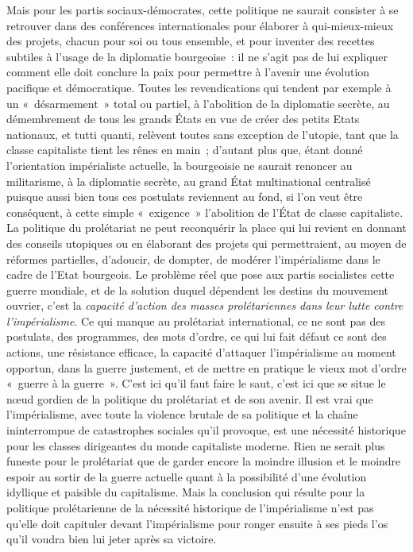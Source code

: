 \documentclass[french,twoside]{book} %
\begin{document}
Mais pour les partis sociaux-démocrates, cette politique ne saurait consister à se retrouver dans des conférences internationales pour élaborer à qui-mieux-mieux des projets, chacun pour soi ou tous ensemble, et pour inventer des recettes subtiles à l’usage de la diplomatie bourgeoise : il ne s’agit pas de lui expliquer comment elle doit conclure la paix pour permettre à l’avenir une évolution pacifique et démocratique. Toutes les revendications qui tendent par exemple à un « désarmement » total ou partiel, à l’abolition de la diplomatie secrète, au démembrement de tous les grands États en vue de créer des petits Etats nationaux, et tutti quanti, relèvent toutes sans exception de l’utopie, tant que la classe capitaliste tient les rênes en main ; d’autant plus que, étant donné l’orientation impérialiste actuelle, la bourgeoisie ne saurait renoncer au militarisme, à la diplomatie secrète, au grand État multinational centralisé puisque aussi bien tous ces postulats reviennent au fond, si l’on veut être conséquent, à cette simple « exigence » l’abolition de l’État de classe capitaliste. La politique du prolétariat ne peut reconquérir la place qui lui revient en donnant des conseils utopiques ou en élaborant des projets qui permettraient, au moyen de réformes partielles, d’adoucir, de dompter, de modérer l’impérialisme dans le cadre de l’Etat bourgeois. Le problème réel que pose aux partis socialistes cette guerre mondiale, et de la solution duquel dépendent les destins du mouvement ouvrier, c’est la \emph{capacité d’action des masses prolétariennes dans leur lutte contre l’impérialisme}. Ce qui manque au prolétariat international, ce ne sont pas des postulats, des programmes, des mots d’ordre, ce qui lui fait défaut ce sont des actions, une résistance efficace, la capacité d’attaquer l’impérialisme au moment opportun, dans la guerre justement, et de mettre en pratique le vieux mot d’ordre « guerre à la guerre ». C'est ici qu’il faut faire le saut, c’est ici que se situe le nœud gordien de la politique du prolétariat et de son avenir. Il est vrai que l’impérialisme, avec toute la violence brutale de sa politique et la chaîne ininterrompue de catastrophes sociales qu’il provoque, est une nécessité historique pour les classes dirigeantes du monde capitaliste moderne. Rien ne serait plus funeste pour le prolétariat que de garder encore la moindre illusion et le moindre espoir au sortir de la guerre actuelle quant à la possibilité d’une évolution idyllique et paisible du capitalisme. Mais la conclusion qui résulte pour la politique  prolétarienne de la nécessité historique de l’impérialisme n’est pas qu’elle doit capituler devant l’impérialisme pour ronger ensuite à ses pieds l’os qu’il voudra bien lui jeter après sa victoire.\par
\end{document}
